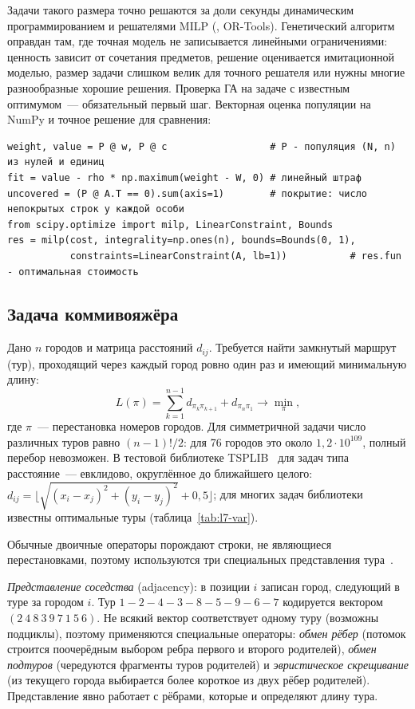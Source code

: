 Задачи такого размера точно решаются за доли секунды динамическим программированием и решателями MILP
(, OR-Tools). Генетический алгоритм оправдан там, где точная модель не
записывается линейными ограничениями: ценность зависит от сочетания предметов, решение оценивается
имитационной моделью, размер задачи слишком велик для точного решателя или нужны многие разнообразные
хорошие решения. Проверка ГА на задаче с известным оптимумом~--- обязательный первый шаг. Векторная
оценка популяции на NumPy и точное решение для сравнения:
\begin{lstlisting}
weight, value = P @ w, P @ c                  # P - популяция (N, n) из нулей и единиц
fit = value - rho * np.maximum(weight - W, 0) # линейный штраф
uncovered = (P @ A.T == 0).sum(axis=1)        # покрытие: число непокрытых строк у каждой особи
from scipy.optimize import milp, LinearConstraint, Bounds
res = milp(cost, integrality=np.ones(n), bounds=Bounds(0, 1),
           constraints=LinearConstraint(A, lb=1))           # res.fun - оптимальная стоимость
\end{lstlisting}

\subsection{Задача коммивояжёра}
\label{sec:tsp}

Дано $n$ городов и матрица расстояний $d_{ij}$. Требуется найти замкнутый маршрут (тур),
проходящий через каждый город ровно один раз и имеющий минимальную длину:
\begin{equation}
\label{eq:tsp}
L(\pi) = \sum_{k=1}^{n-1} d_{\pi_k \pi_{k+1}} + d_{\pi_n \pi_1} \to \min_{\pi},
\end{equation}
где $\pi$~--- перестановка номеров городов. Для симметричной задачи число различных туров равно
$(n - 1)!/2$: для 76 городов это около $1,2 \cdot 10^{109}$, полный перебор невозможен. В тестовой
библиотеке TSPLIB~\cite{reinelt1991} для задач типа  расстояние~--- евклидово, округлённое
до ближайшего целого: $d_{ij} = \bigl\lfloor\sqrt{(x_i - x_j)^2 + (y_i - y_j)^2} + 0,5\bigr\rfloor$;
для многих задач библиотеки известны оптимальные туры (таблица~\ref{tab:l7-var}).

Обычные двоичные операторы порождают строки, не являющиеся перестановками, поэтому используются три
специальных представления тура~\cite{michalewicz1996, skobtsov2018}.

\emph{Представление соседства} (adjacency): в позиции $i$ записан город, следующий в туре за городом $i$.
Тур $1{-}2{-}4{-}3{-}8{-}5{-}9{-}6{-}7$ кодируется вектором $(2\ 4\ 8\ 3\ 9\ 7\ 1\ 5\ 6)$. Не всякий вектор
соответствует одному туру (возможны подциклы), поэтому применяются специальные операторы:
\emph{обмен рёбер} (потомок строится поочерёдным выбором ребра первого и второго родителей),
\emph{обмен подтуров} (чередуются фрагменты туров родителей) и \emph{эвристическое скрещивание}
(из текущего города выбирается более короткое из двух рёбер родителей). Представление явно работает с
рёбрами, которые и определяют длину тура.

